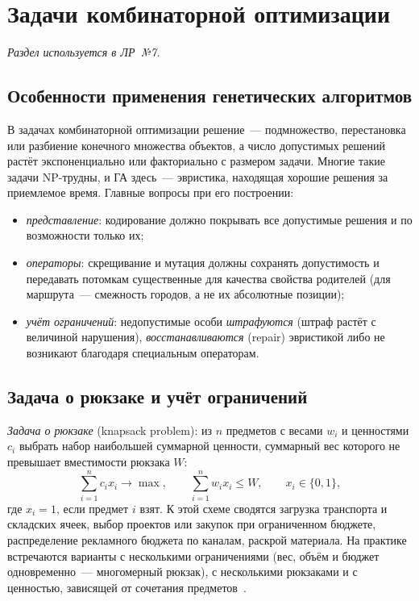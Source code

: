 \section{Задачи комбинаторной оптимизации}
\label{sec:combinatorial}

\noindent\hspace{1.25cm}\emph{Раздел используется в ЛР~№7.}

\subsection{Особенности применения генетических алгоритмов}

В задачах комбинаторной оптимизации решение~--- подмножество, перестановка или разбиение конечного
множества объектов, а число допустимых решений растёт экспоненциально или факториально с размером
задачи. Многие такие задачи NP-трудны, и ГА здесь~--- эвристика, находящая хорошие решения за
приемлемое время. Главные вопросы при его построении:
\begin{itemize}
\item \emph{представление}: кодирование должно покрывать все допустимые решения и по возможности только
их;
\item \emph{операторы}: скрещивание и мутация должны сохранять допустимость и передавать потомкам
существенные для качества свойства родителей (для маршрута~--- смежность городов, а не их абсолютные
позиции);
\item \emph{учёт ограничений}: недопустимые особи \emph{штрафуются} (штраф растёт с величиной нарушения),
\emph{восстанавливаются} (repair) эвристикой либо не возникают благодаря специальным операторам.
\end{itemize}

\subsection{Задача о рюкзаке и учёт ограничений}
\label{sec:knapsack}

\emph{Задача о рюкзаке} (knapsack problem): из $n$ предметов с весами $w_i$ и ценностями $c_i$ выбрать набор
наибольшей суммарной ценности, суммарный вес которого не превышает вместимости рюкзака $W$:
\begin{equation}
\label{eq:knapsack}
\sum_{i=1}^{n} c_i x_i \to \max, \qquad \sum_{i=1}^{n} w_i x_i \le W, \qquad x_i \in \{0, 1\},
\end{equation}
где $x_i = 1$, если предмет $i$ взят. К этой схеме сводятся загрузка транспорта и складских ячеек, выбор
проектов или закупок при ограниченном бюджете, распределение рекламного бюджета по каналам, раскрой
материала. На практике встречаются варианты с несколькими ограничениями (вес, объём и бюджет
одновременно~--- многомерный рюкзак), с несколькими рюкзаками и с ценностью, зависящей от сочетания
предметов~\cite{martello1990}.

